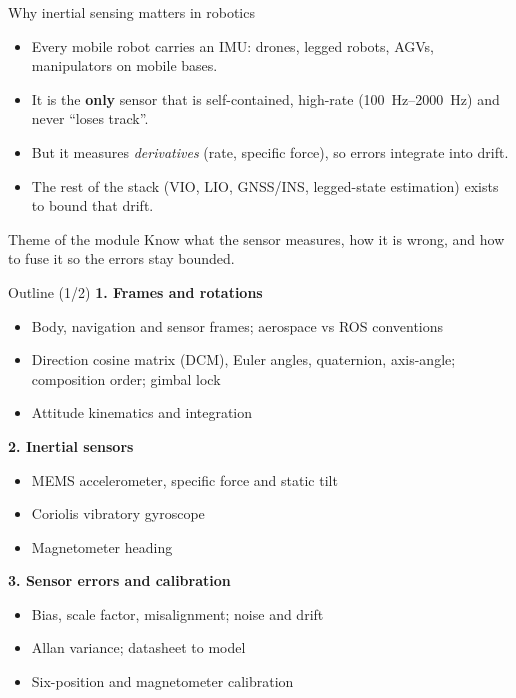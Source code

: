 \begin{frame}{Why inertial sensing matters in robotics}
  \begin{itemize}
    \item Every mobile robot carries an IMU: drones, legged robots, AGVs, manipulators on mobile bases.
    \item It is the \textbf{only} sensor that is self-contained, high-rate (\SIrange{100}{2000}{\hertz}) and never ``loses track''.
    \item But it measures \emph{derivatives} (rate, specific force), so errors integrate into drift.
    \item The rest of the stack (VIO, LIO, GNSS/INS, legged-state estimation) exists to bound that drift.
  \end{itemize}
  \vfill
  \begin{block}{Theme of the module}
    Know what the sensor measures, how it is wrong, and how to fuse it so the errors stay bounded.
  \end{block}
\end{frame}

\begin{frame}{Outline (1/2)}
  \small
  \textbf{1. Frames and rotations}
  \begin{itemize}
    \item Body, navigation and sensor frames; aerospace vs ROS conventions
    \item Direction cosine matrix (DCM), Euler angles, quaternion, axis-angle; composition order; gimbal lock
    \item Attitude kinematics and integration
  \end{itemize}
  \textbf{2. Inertial sensors}
  \begin{itemize}
    \item MEMS accelerometer, specific force and static tilt
    \item Coriolis vibratory gyroscope
    \item Magnetometer heading
  \end{itemize}
  \textbf{3. Sensor errors and calibration}
  \begin{itemize}
    \item Bias, scale factor, misalignment; noise and drift
    \item Allan variance; datasheet to model
    \item Six-position and magnetometer calibration
  \end{itemize}
\end{frame}

